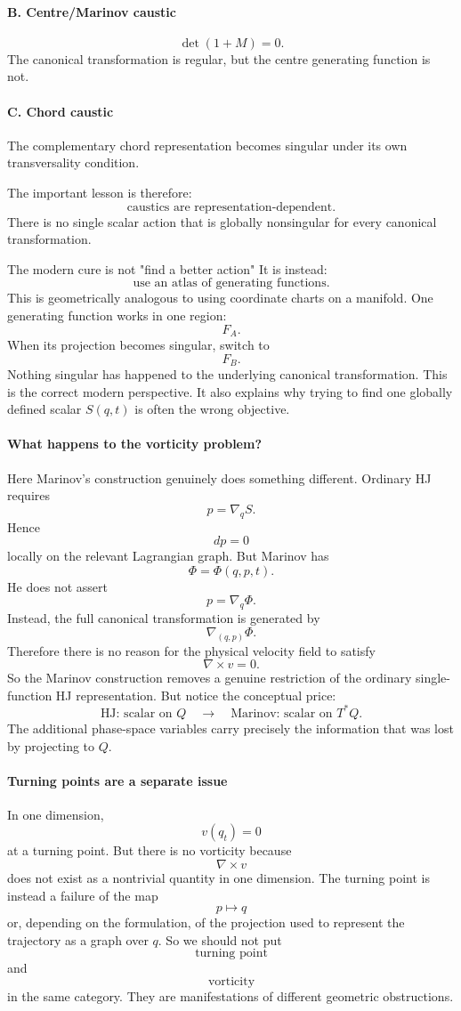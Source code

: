 \paragraph{B. Centre/Marinov caustic}
$$ \det(1+M)=0. $$
The canonical transformation is regular, but the centre generating function is
not.

\paragraph{C. Chord caustic}
The complementary chord representation becomes singular under its own
transversality condition.

The important lesson is therefore:
$$ \boxed{ \text{caustics are representation-dependent.} } $$
There is no single scalar action that is globally nonsingular for every
canonical transformation.

 The modern cure is not "find a better action"
It is instead:
$$ \boxed{\text{use an atlas of generating functions}.} $$
This is geometrically analogous to using coordinate charts on a manifold.
One generating function works in one region:
$$ F_A. $$
When its projection becomes singular, switch to
$$ F_B. $$
Nothing singular has happened to the underlying canonical transformation.
This is the correct modern perspective.
It also explains why trying to find one globally defined scalar \(S(q,t)\) is
often the wrong objective.

\paragraph{ What happens to the vorticity problem?}
Here Marinov's construction genuinely does something different.
Ordinary HJ requires
$$ p=\nabla_q S. $$
Hence
$$ dp=0 $$
locally on the relevant Lagrangian graph.
But Marinov has
$$ \Phi=\Phi(q,p,t). $$
He does not assert
$$ p=\nabla_q\Phi. $$
Instead, the full canonical transformation is generated by
$$ \nabla_{(q,p)}\Phi. $$
Therefore there is no reason for the physical velocity field to satisfy
$$ \nabla\times v=0. $$
So the Marinov construction removes a genuine restriction of the ordinary
single-function HJ representation.
But notice the conceptual price:
$$ \boxed{ \text{HJ: scalar on }Q \quad\longrightarrow\quad \text{Marinov: scalar on }T^*Q. } $$
The additional phase-space variables carry precisely the information that was
lost by projecting to \(Q\).

\paragraph{Turning points are a separate issue}
In one dimension,
$$ v(q_t)=0 $$
at a turning point.
But there is no vorticity because
$$ \nabla\times v $$
does not exist as a nontrivial quantity in one dimension.
The turning point is instead a failure of the map
$$ p\mapsto q $$
or, depending on the formulation, of the projection used to represent the
trajectory as a graph over \(q\).
So we should not put
$$ \text{turning point} $$
and
$$ \text{vorticity} $$
in the same category.
They are manifestations of different geometric obstructions.


